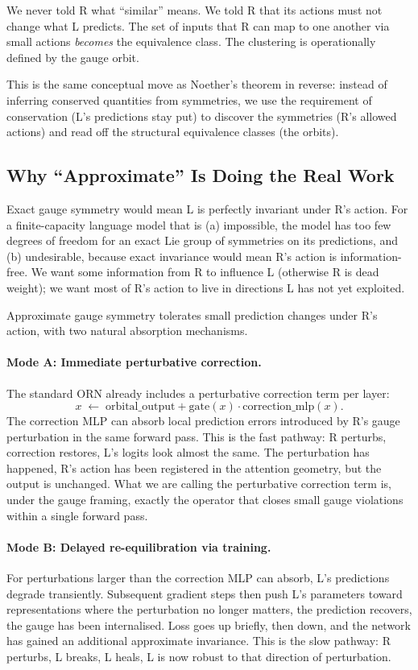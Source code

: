 \documentclass[11pt, a4paper]{article}
\theoremstyle{plain}
\theoremstyle{definition}
\theoremstyle{remark}
\begin{document}
We never told R what ``similar'' means.
We told R that its actions must not change what L predicts.
The set of inputs that R can map to one another via small actions \emph{becomes} the equivalence class.
The clustering is operationally defined by the gauge orbit.

This is the same conceptual move as Noether's theorem in reverse: instead of inferring conserved quantities from symmetries, we use the requirement of conservation (L's predictions stay put) to discover the symmetries (R's allowed actions) and read off the structural equivalence classes (the orbits).

\subsection{Why ``Approximate'' Is Doing the Real Work}

Exact gauge symmetry would mean L is perfectly invariant under R's action.
For a finite-capacity language model that is (a) impossible, the model has too few degrees of freedom for an exact Lie group of symmetries on its predictions, and (b) undesirable, because exact invariance would mean R's action is information-free.
We want some information from R to influence L (otherwise R is dead weight); we want most of R's action to live in directions L has not yet exploited.

Approximate gauge symmetry tolerates small prediction changes under R's action, with two natural absorption mechanisms.

\paragraph{Mode A: Immediate perturbative correction.}
The standard ORN already includes a perturbative correction term per layer:
\[
x \;\leftarrow\; \mathrm{orbital\_output} + \mathrm{gate}(x) \cdot \mathrm{correction\_mlp}(x).
\]
The correction MLP can absorb local prediction errors introduced by R's gauge perturbation in the same forward pass.
This is the fast pathway: R perturbs, correction restores, L's logits look almost the same.
The perturbation has happened, R's action has been registered in the attention geometry, but the output is unchanged.
What we are calling the perturbative correction term is, under the gauge framing, exactly the operator that closes small gauge violations within a single forward pass.

\paragraph{Mode B: Delayed re-equilibration via training.}
For perturbations larger than the correction MLP can absorb, L's predictions degrade transiently.
Subsequent gradient steps then push L's parameters toward representations where the perturbation no longer matters, the prediction recovers, the gauge has been internalised.
Loss goes up briefly, then down, and the network has gained an additional approximate invariance.
This is the slow pathway: R perturbs, L breaks, L heals, L is now robust to that direction of perturbation.
\end{document}
